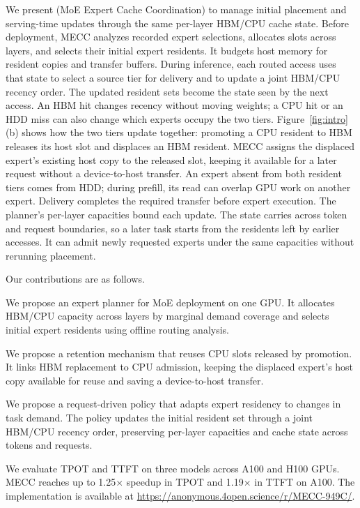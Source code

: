 We present \mecc{} (MoE Expert Cache Coordination) to manage initial placement and serving-time updates through the same per-layer HBM/CPU cache state.
Before deployment, MECC analyzes recorded expert selections, allocates slots across layers, and selects their initial expert residents.
It budgets host memory for resident copies and transfer buffers.
During inference, each routed access uses that state to select a source tier for delivery and to update a joint HBM/CPU recency order.
The updated resident sets become the state seen by the next access.
An HBM hit changes recency without moving weights; a CPU hit or an HDD miss can also change which experts occupy the two tiers.
Figure~\ref{fig:intro}(b) shows how the two tiers update together: promoting a CPU resident to HBM releases its host slot and displaces an HBM resident.
MECC assigns the displaced expert's existing host copy to the released slot, keeping it available for a later request without a device-to-host transfer.
An expert absent from both resident tiers comes from HDD; during prefill, its read can overlap GPU work on another expert.
Delivery completes the required transfer before expert execution.
The planner's per-layer capacities bound each update.
The state carries across token and request boundaries, so a later task starts from the residents left by earlier accesses.
It can admit newly requested experts under the same capacities without rerunning placement.

Our contributions are as follows.
\begin{list}{}{\setlength{\leftmargin}{16pt}\setlength{\labelwidth}{14pt}\setlength{\labelsep}{2pt}\setlength{\itemsep}{3pt}\setlength{\topsep}{3pt}}
\item[(1)] We propose an expert planner for MoE deployment on one GPU.
It allocates HBM/CPU capacity across layers by marginal demand coverage and selects initial expert residents using offline routing analysis.
\item[(2)] We propose a retention mechanism that reuses CPU slots released by promotion.
It links HBM replacement to CPU admission, keeping the displaced expert's host copy available for reuse and saving a device-to-host transfer.
\item[(3)] We propose a request-driven policy that adapts expert residency to changes in task demand.
The policy updates the initial resident set through a joint HBM/CPU recency order, preserving per-layer capacities and cache state across tokens and requests.
\end{list}
We evaluate TPOT and TTFT on three models across A100 and H100 GPUs.
MECC reaches up to 1.25$\times$ speedup in TPOT and 1.19$\times$ in TTFT on A100.
The implementation is available at \url{https://anonymous.4open.science/r/MECC-949C/}.
